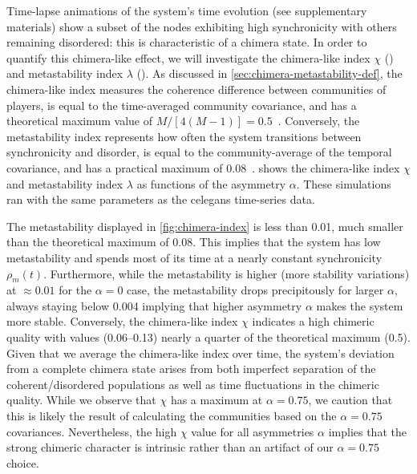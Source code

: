\documentclass[pdflatex,lineno,referee,sn-nature]{sn-jnl}
\begin{document}
Time-lapse animations of the system's time evolution
(see supplementary materials)
show a subset of the nodes exhibiting high synchronicity
with others remaining disordered: this is characteristic of a chimera state.
In order to quantify this chimera-like effect, we will investigate
the chimera-like index $\chi$ ()
and metastability index $\lambda$ ().
As discussed in \cref{sec:chimera-metastability-def},
the chimera-like index
measures the coherence difference between communities of players,
is equal to the time-averaged community covariance,
and has a theoretical maximum value
of $M/[4(M-1)] = \num{0.5}$~\citep{shanahan2010metastable}.
Conversely, the metastability index
represents how often the system transitions
between synchronicity and disorder,
is equal to the community-average of the temporal covariance,
and has a practical maximum of \num{0.08}~\citep{shanahan2010metastable}.
 shows the
 chimera-like index $\chi$
and
 metastability index $\lambda$
as functions of the asymmetry $\alpha$.
These simulations ran with the same parameters as the
\gls{celegans} time-series data.

The metastability displayed in \cref{fig:chimera-index}
is less than \num{0.01}, much smaller
than the theoretical maximum of \num{0.08}.
This implies that the system has low metastability
and spends most of its time at a nearly constant
synchronicity $\rho_m(t)$.
Furthermore, while the metastability is higher (more stability variations)
at $\approx \num{0.01}$ for the $\alpha = 0$ case,
the metastability drops precipitously for larger $\alpha$,
always staying below \num{0.004} implying that
higher asymmetry $\alpha$ makes the system more stable.
Conversely, the chimera-like index $\chi$
indicates a high chimeric quality
with values (\numrange{0.06}{0.13})
nearly a quarter of the theoretical maximum (\num{0.5}).
Given that we average the chimera-like index over time,
the system's deviation from a complete chimera state
arises from both imperfect separation of the coherent/disordered populations
as well as time fluctuations in the chimeric quality.
While we observe that $\chi$ has a maximum at $\alpha = \num{0.75}$,
we caution that this is likely the result of calculating the communities
based on the $\alpha = \num{0.75}$ covariances.
Nevertheless, the high $\chi$ value for all asymmetries $\alpha$
implies that the strong chimeric character is intrinsic
rather than an artifact of our $\alpha = \num{0.75}$ choice.
\end{document}
